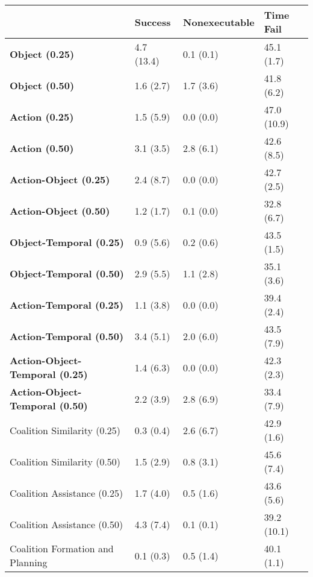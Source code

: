 \begin{tabular}{llll}
\hline
                                        & Success    & Nonexecutable   & Time Fail   \\
\hline
 \textbf{Object (0.25)}                 & 4.7 (13.4) & 0.1 (0.1)       & 45.1 (1.7)  \\
 \textbf{Object (0.50)}                 & 1.6 (2.7)  & 1.7 (3.6)       & 41.8 (6.2)  \\
 \textbf{Action (0.25)}                 & 1.5 (5.9)  & 0.0 (0.0)       & 47.0 (10.9) \\
 \textbf{Action (0.50)}                 & 3.1 (3.5)  & 2.8 (6.1)       & 42.6 (8.5)  \\
 \textbf{Action-Object (0.25)}          & 2.4 (8.7)  & 0.0 (0.0)       & 42.7 (2.5)  \\
 \textbf{Action-Object (0.50)}          & 1.2 (1.7)  & 0.1 (0.0)       & 32.8 (6.7)  \\
 \textbf{Object-Temporal (0.25)}        & 0.9 (5.6)  & 0.2 (0.6)       & 43.5 (1.5)  \\
 \textbf{Object-Temporal (0.50)}        & 2.9 (5.5)  & 1.1 (2.8)       & 35.1 (3.6)  \\
 \textbf{Action-Temporal (0.25)}        & 1.1 (3.8)  & 0.0 (0.0)       & 39.4 (2.4)  \\
 \textbf{Action-Temporal (0.50)}        & 3.4 (5.1)  & 2.0 (6.0)       & 43.5 (7.9)  \\
 \textbf{Action-Object-Temporal (0.25)} & 1.4 (6.3)  & 0.0 (0.0)       & 42.3 (2.3)  \\
 \textbf{Action-Object-Temporal (0.50)} & 2.2 (3.9)  & 2.8 (6.9)       & 33.4 (7.9)  \\
 Coalition Similarity (0.25)            & 0.3 (0.4)  & 2.6 (6.7)       & 42.9 (1.6)  \\
 Coalition Similarity (0.50)            & 1.5 (2.9)  & 0.8 (3.1)       & 45.6 (7.4)  \\
 Coalition Assistance (0.25)            & 1.7 (4.0)  & 0.5 (1.6)       & 43.6 (5.6)  \\
 Coalition Assistance (0.50)            & 4.3 (7.4)  & 0.1 (0.1)       & 39.2 (10.1) \\
 Coalition Formation and Planning       & 0.1 (0.3)  & 0.5 (1.4)       & 40.1 (1.1)  \\
\hline
\end{tabular}